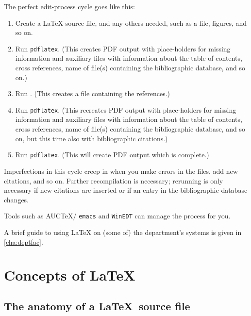 \documentclass[authoryearcitations]{UoYCSproject}
\begin{document}
The perfect edit-process cycle goes like this:
\begin{enumerate}
\item Create a \LaTeX{} source file, and any others needed, such as a
  \BibTeX{} file, figures, and so on.
\item Run \lstinline|pdflatex|.  (This creates PDF output with
  place-holders for missing information and auxiliary files with
  information about the table of contents, cross references, name of
  file(s) containing the bibliographic database, and so on.)
\item Run \BibTeX.  (This creates a file containing the references.)
\item Run \lstinline|pdflatex|.  (This recreates PDF output with
  place-holders for missing information and auxiliary files with
  information about the table of contents, cross references, name of
  file(s) containing the bibliographic database, and so on, but this
  time also with bibliographic citations.)
\item Run \lstinline|pdflatex|. (This will create PDF output which is
  complete.)
\end{enumerate}
Imperfections in this cycle creep in when you make errors in the
files, add new citations, and so on.  Further recompilation is
necessary; rerunning \BibTeX{} is only necessary if new citations are
inserted or if an entry in the bibliographic database changes.

Tools such as AUC\TeX{}/ \lstinline|emacs| and \lstinline|WinEDT| can
manage the process for you.

A brief guide to using \LaTeX{} on (some of) the department's systems
is given in \autoref{cha:deptfac}.



\cleardoublepage
\part{Concepts of \LaTeX}
\label{sec:middle}
\thispagestyle{empty}\cleardoublepage

\chapter{The anatomy of a \LaTeX\ source file}
\label{cha:anatomy}
\end{document}
